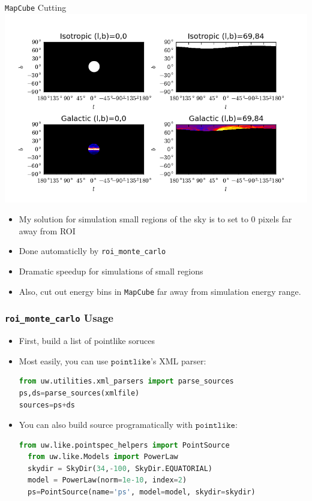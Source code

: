 \documentclass[12pt]{beamer}
\newcommand{\pointlike}{\ensuremath{\mathtt{pointlike}}\xspace}
\newcommand{\roimc}{\texttt{roi\_monte\_carlo}\xspace}
\newcommand{\mapcube}{\texttt{MapCube}\xspace}
\begin{document}
\begin{frame}{\mapcube Cutting}
  \includegraphics[scale=0.4]{plots/allsky_cubes.png}
  \begin{itemize}
    \item My solution for simulation small regions of the sky is to set to 0 pixels
      far away from ROI
    \item Done automaticlly by \roimc
    \item Dramatic speedup for simulations of small regions
    \item Also, cut out energy bins in \mapcube far away from simulation energy range.
    \end{itemize}
\end{frame}

\begin{frame}[fragile]
  \frametitle{\roimc Usage}
  \begin{itemize}
    \item First, build a list of pointlike soruces
    \item Most easily, you can use \pointlike's XML parser:
\begin{lstlisting}[language=Python]
from uw.utilities.xml_parsers import parse_sources
ps,ds=parse_sources(xmlfile)
sources=ps+ds
\end{lstlisting}
\item You can also build source programatically with \pointlike:
\begin{lstlisting}[language=Python]
  from uw.like.pointspec_helpers import PointSource
  from uw.like.Models import PowerLaw
  skydir = SkyDir(34,-100, SkyDir.EQUATORIAL)
  model = PowerLaw(norm=1e-10, index=2)
  ps=PointSource(name='ps', model=model, skydir=skydir)
\end{lstlisting}
  \end{itemize}
\end{frame}
\end{document}
